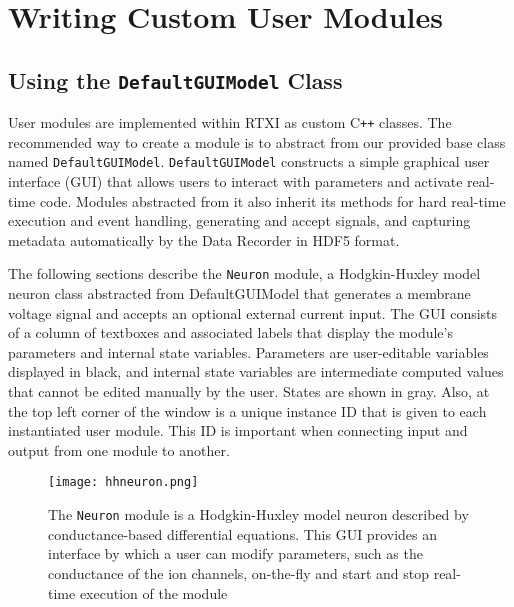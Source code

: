 \chapter{Writing Custom User Modules}
\label{custommodules}

\section{Using the \texttt{DefaultGUIModel} Class}
\label{defaultGUImodules}

User modules are implemented within RTXI as custom C\texttt{++} classes. The recommended way to create a module is to abstract from our provided base class named \texttt{DefaultGUIModel}. \texttt{DefaultGUIModel} constructs a simple graphical user interface (GUI) that allows users to interact with parameters and activate real-time code. Modules abstracted from it also inherit its methods for hard real-time execution and event handling, generating and accept signals, and capturing metadata automatically by the Data Recorder in HDF5 format. 

The following sections describe the \texttt{Neuron} module, a Hodgkin-Huxley model neuron class abstracted from DefaultGUIModel that generates a membrane voltage signal and accepts an optional external current input. The GUI consists of a column of textboxes and associated labels that display the module's parameters and internal state variables. Parameters are user-editable variables displayed in black, and internal state variables are intermediate computed values that cannot be edited manually by the user. States are shown in gray. Also, at the top left corner of the window is a unique instance ID that is given to each instantiated user module. This ID is important when connecting input and output from one module to another. 

\begin{figure}[h!] 
\begin{center}
\label{NeuronGUI}
\texttt{[image: hhneuron.png]} 
\caption[The Neuron module's GUI]{The \texttt{Neuron} module is a Hodgkin-Huxley model neuron described by conductance-based differential equations. This GUI provides an interface by which a user can modify parameters, such as the conductance of the ion channels, on-the-fly and start and stop real-time execution of the module} 
\end{center}
\end{figure}

